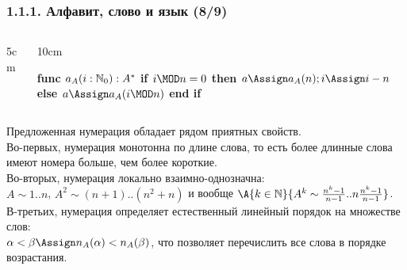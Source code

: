 \begin{frame}
\frametitle{1.1.1. Алфавит, слово и язык (8/9)}

\vspace{-12pt}
\begin{columns}[t]
\begin{column}{5cm}
\begin{algorithmic}
\ENDFOR
{}
\end{algorithmic}
\end{column}    
\begin{column}{10cm}
\begin{algorithmic}
\STATE \textbf{func $a_A(i : \Bbb{N}_0) : A^*$}
\STATE{$\alpha\Assign \varepsilon$}
\STATE\textbf{if $i\MOD n =0 $ then $a\Assign a_A(n); i\Assign i-n$}
\STATE\textbf{ else $a\Assign a_A(i\MOD n)$ end if}
\ENDWHILE
{}
\end{algorithmic}
\end{column}
\end{columns}    

\medskip
\begin{remark}
Предложенная нумерация обладает рядом приятных свойств. \\Во-первых, нумерация монотонна по длине слова, то есть более длинные слова имеют номера больше, чем более короткие. 
\\Во-вторых, нумерация локально взаимно-однозначна:\\
$A\sim 1..n$, $A^2\sim (n+1)..(n^2+n)$ и вообще
$\A{k\in \Bbb{N}}{A^k \sim \frac{n^{k}-1}{n-1}.. n\frac{n^k-1}{n-1}}
$.\\
В-третьих, нумерация определяет естественный
линейный порядок на множестве слов:\\
$\alpha<\beta \Assign n_A(\alpha)<n_A(\beta)$,
что позволяет перечислить все слова в порядке возрастания.  
\end{remark}


\end{frame}

